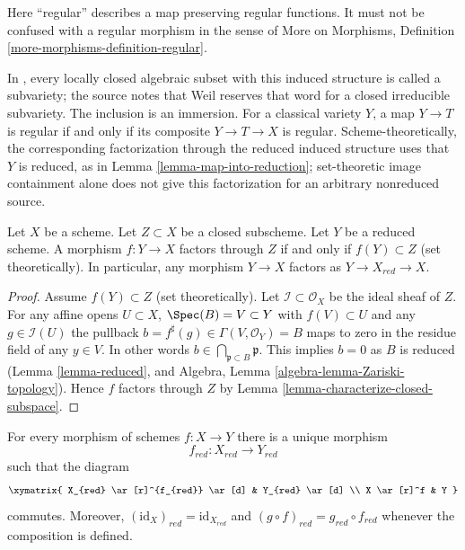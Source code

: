 \begin{remark}
Here ``regular'' describes a map preserving regular functions. It must not
be confused with a regular morphism in the sense of
More on Morphisms, Definition \ref{more-morphisms-definition-regular}.

In \cite{FAC}, every locally closed algebraic subset with this induced
structure is called a subvariety; the source notes that Weil reserves that
word for a closed irreducible subvariety. The inclusion is an immersion.
For a classical variety $Y$, a map $Y \to T$ is regular if and only if its
composite $Y \to T \to X$ is regular. Scheme-theoretically, the corresponding
factorization through the reduced induced structure uses that $Y$ is reduced,
as in Lemma \ref{lemma-map-into-reduction}; set-theoretic image containment
alone does not give this factorization for an arbitrary nonreduced source.
\end{remark}

\begin{lemma}
\label{lemma-map-into-reduction}
Let $X$ be a scheme.
Let $Z \subset X$ be a closed subscheme.
Let $Y$ be a reduced scheme.
A morphism $f : Y \to X$ factors through $Z$ if and only if
$f(Y) \subset Z$ (set theoretically). In particular, any
morphism $Y \to X$ factors as $Y \to X_{red} \to X$.
\end{lemma}

\begin{proof}
Assume $f(Y) \subset Z$ (set theoretically).
Let $\mathcal{I} \subset \mathcal{O}_X$ be the ideal sheaf of $Z$.
For any affine opens $U \subset X$, $\Spec(B) = V \subset Y$
with $f(V) \subset U$ and any $g \in \mathcal{I}(U)$
the pullback $b = f^\sharp(g) \in \Gamma(V, \mathcal{O}_Y) = B$
maps to zero in the residue field of any $y \in V$.
In other words $b \in \bigcap_{\mathfrak p \subset B} \mathfrak p$.
This implies $b = 0$ as $B$ is reduced (Lemma \ref{lemma-reduced}, and
Algebra, Lemma \ref{algebra-lemma-Zariski-topology}).
Hence $f$ factors through
$Z$ by Lemma \ref{lemma-characterize-closed-subspace}.
\end{proof}

\begin{lemma}
\label{lemma-reduction-functorial}
\begin{reference}
\cite[(5.1.5)]{EGA1}
\end{reference}
For every morphism of schemes $f : X \to Y$ there is a unique morphism
$$
f_{red} : X_{red} \longrightarrow Y_{red}
$$
such that the diagram
$$
\xymatrix{
X_{red} \ar[r]^{f_{red}} \ar[d] & Y_{red} \ar[d] \\
X \ar[r]^f & Y
}
$$
commutes. Moreover, $(\text{id}_X)_{red} = \text{id}_{X_{red}}$ and
$(g \circ f)_{red} = g_{red} \circ f_{red}$ whenever the composition is
defined.
\end{lemma}

